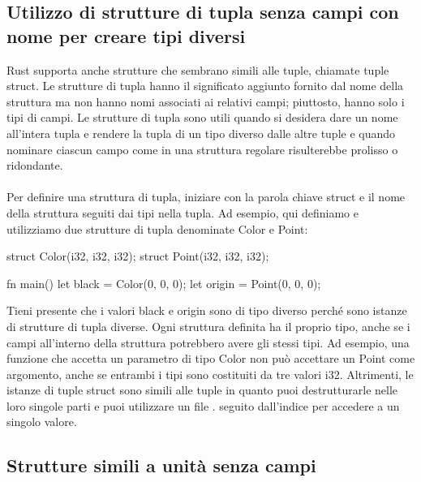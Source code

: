 \documentclass[11pt,a4paper]{article}
\begin{document}
\subsection{Utilizzo di strutture di tupla senza campi con nome per creare tipi diversi}

Rust supporta anche strutture che sembrano simili alle tuple, chiamate tuple struct. Le strutture di tupla hanno il significato aggiunto fornito dal nome della struttura ma non hanno nomi associati ai relativi campi; piuttosto, hanno solo i tipi di campi. Le strutture di tupla sono utili quando si desidera dare un nome all'intera tupla e rendere la tupla di un tipo diverso dalle altre tuple e quando nominare ciascun campo come in una struttura regolare risulterebbe prolisso o ridondante.\\
\\
Per definire una struttura di tupla, iniziare con la parola chiave struct e il nome della struttura seguiti dai tipi nella tupla. Ad esempio, qui definiamo e utilizziamo due strutture di tupla denominate Color e Point:
\begin{rust}
struct Color(i32, i32, i32);
struct Point(i32, i32, i32);

fn main() {
    let black = Color(0, 0, 0);
    let origin = Point(0, 0, 0);
}
\end{rust}
Tieni presente che i valori black e origin sono di tipo diverso perché sono istanze di strutture di tupla diverse. Ogni struttura definita ha il proprio tipo, anche se i campi all'interno della struttura potrebbero avere gli stessi tipi. Ad esempio, una funzione che accetta un parametro di tipo Color non può accettare un Point come argomento, anche se entrambi i tipi sono costituiti da tre valori i32. Altrimenti, le istanze di tuple struct sono simili alle tuple in quanto puoi destrutturarle nelle loro singole parti e puoi utilizzare un file . seguito dall'indice per accedere a un singolo valore.

\subsection{Strutture simili a unità senza campi}
\end{document}
